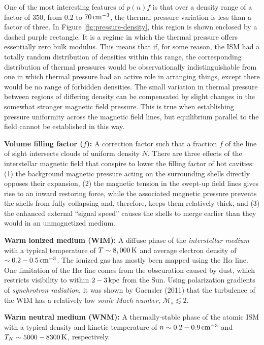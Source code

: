 \documentclass[a4paper,10pt]{article}
\begin{document}
{\noindent}One of the most interesting features of $p(n)f$ is that over a density range of a factor of $350$, from $0.2$ to $70\,{\rm cm^{-3}}$, the thermal pressure variation is less than a factor of three. In Figure \ref{fig:pressure-density}, this region is shown enclosed by a dashed purple rectangle. It is a regime in which the thermal pressure offers essentially zero bulk modulus. This means that if, for some reason, the ISM had a totally random distribution of densities within this range, the corresponding distribution of thermal pressures would be observationally indistinguishable from one in which thermal pressure had an active role in arranging things, except there would be no range of forbidden densities. The small variation in thermal pressure between regions of differing density can be compensated by slight changes in the somewhat stronger magnetic field pressure. This is true when establishing pressure uniformity across the magnetic field lines, but equilibrium parallel to the field cannot be established in this way.

{\noindent}\textbf{Volume filling factor ($f$):} A correction factor such that a fraction $f$ of the line of sight intersects clouds of uniform density $N$. There are three effects of the interstellar magnetic field that conspire to lower the filling factor of hot cavities: (1) the background magnetic pressure acting on the surrounding shells directly opposes their expansion, (2) the magnetic tension in the swept-up field lines gives rise to an inward restoring force, while the associated magnetic pressure prevents the shells from fully collapsing and, therefore, keeps them relatively thick, and (3) the enhanced external ``signal speed'' causes the shells to merge earlier than they would in an unmagnetized medium.

{\noindent}\textbf{Warm ionized medium (WIM):} A diffuse phase of the \textit{interstellar medium} with a typical temperature of $T\sim8,000\,{\rm K}$ and average electron density of $\sim0.2-0.5\,{\rm cm^{-3}}$.  The ionized gas has mostly been mapped using the H$\alpha$ line. One limitation of the H$\alpha$ line comes from the obscuration caused by dust, which restricts visibility to within $2-3\,{\rm kpc}$ from the Sun. Using polarization gradients of \textit{synchrotron radiation}, it was shown by Gaensler (2011) that the turbulence of the WIM has a relatively low \textit{sonic Mach number}, $\mathcal{M}_s\lesssim2$.

{\noindent}\textbf{Warm neutral medium (WNM):} A thermally-stable phase of the atomic ISM with a typical density and kinetic temperature of $n\sim0.2-0.9\,{\rm cm^{-3}}$ and $T_K\sim5000-8300\,{\rm K}$, respectively.
\end{document}
